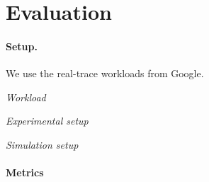 \section{Evaluation}

\paragraph{Setup.} We use the real-trace workloads from Google.

\emph{Workload}

\emph{Experimental setup}

\emph{Simulation setup}

\paragraph{Metrics}



